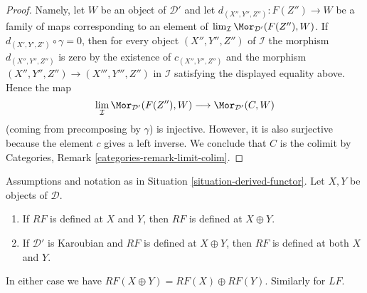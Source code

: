 \begin{proof}
Namely, let $W$ be an object of $\mathcal{D}'$ and let
$d_{(X'', Y'', Z'')} : F(Z'') \to W$ be a family of maps corresponding
to an element of $\lim_\mathcal{I} \Mor_{\mathcal{D}'}(F(Z''), W)$.
If $d_{(X', Y', Z')} \circ \gamma = 0$, then for every object
$(X'', Y'', Z'')$ of $\mathcal{I}$ the morphism $d_{(X'', Y'', Z'')}$
is zero by the existence of $c_{(X'', Y'', Z'')}$ and the
morphism $(X'', Y'', Z'') \to (X''', Y''', Z'')$ in $\mathcal{I}$
satisfying the displayed equality above. Hence the map
$$
\lim_\mathcal{I} \Mor_{\mathcal{D}'}(F(Z''), W)
\longrightarrow
\Mor_{\mathcal{D}'}(C, W)
$$
(coming from precomposing by $\gamma$) is injective. However, it is
also surjective because the element $c$ gives a left inverse. We conclude
that $C$ is the colimit by
Categories, Remark \ref{categories-remark-limit-colim}.
\end{proof}

\begin{lemma}
\label{lemma-direct-sum-defined}
Assumptions and notation as in Situation \ref{situation-derived-functor}.
Let $X, Y$ be objects of $\mathcal{D}$.
\begin{enumerate}
\item If $RF$ is defined at $X$ and $Y$, then $RF$ is defined at $X \oplus Y$.
\item If $\mathcal{D}'$ is Karoubian and $RF$ is defined at $X \oplus Y$,
then $RF$ is defined at both $X$ and $Y$.
\end{enumerate}
In either case we have $RF(X \oplus Y) = RF(X) \oplus RF(Y)$.
Similarly for $LF$.
\end{lemma}

